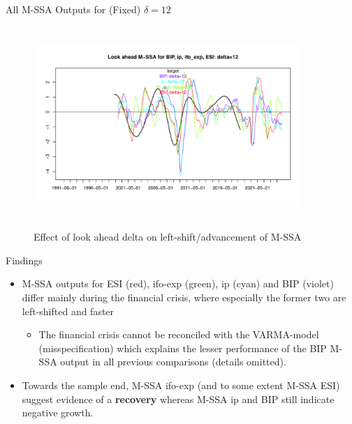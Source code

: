 \documentclass{beamer}
\begin{document}
\begin{frame} {All M-SSA Outputs for (Fixed) $\delta=12$}
\begin{figure}[H]\begin{center}\includegraphics[height=3in, width=4in]{look_ahead_ssa_3.pdf}\caption{Effect of look ahead delta on  left-shift/advancement of M-SSA\label{cor}}\end{center}\end{figure}\end{frame}

\begin{frame} {Findings}
\begin{itemize}
\item M-SSA outputs for ESI (red), ifo-exp (green), ip (cyan) and BIP (violet) differ mainly during the financial crisis, where especially the former two are left-shifted and faster 
\begin{itemize}
\item The financial crisis cannot be reconciled with the VARMA-model (misspecification) which explains the lesser performance of the BIP M-SSA output in all previous comparisons (details omitted).
\end{itemize}
\item Towards the sample end, M-SSA ifo-exp (and to some extent M-SSA ESI) suggest evidence of a  \textbf{recovery} whereas M-SSA ip and BIP still indicate negative growth.

\end{itemize}

\end{frame}
\end{document}
